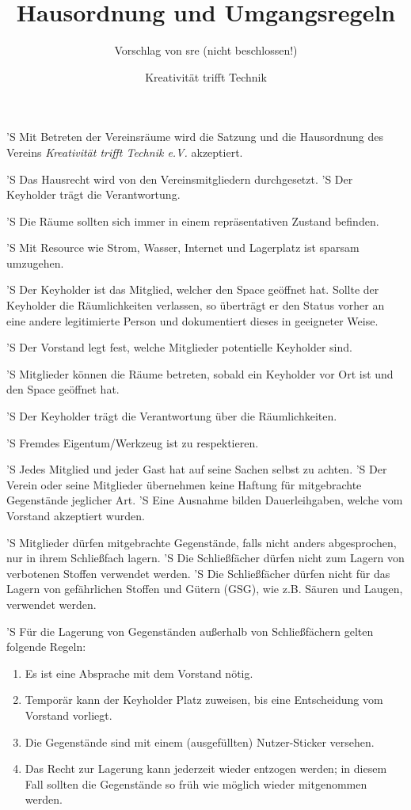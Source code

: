 \documentclass[a4paper,10pt]{scrreprt}
\begin{document}
\title{Hausordnung und Umgangsregeln}
\subtitle{Vorschlag von sre (nicht beschlossen!)}
\author{Kreativität trifft Technik}



\begin{contract}


'S Mit Betreten der Vereinsräume wird die Satzung und die Hausordnung des
Vereins \textit{Kreativität trifft Technik e.V.} akzeptiert.

'S Das Hausrecht wird von den Vereinsmitgliedern durchgesetzt.
'S Der Keyholder trägt die Verantwortung.

'S Die Räume sollten sich immer in einem repräsentativen Zustand befinden.

'S Mit Resource wie Strom, Wasser, Internet und Lagerplatz ist sparsam umzugehen.


'S Der Keyholder ist das Mitglied, welcher den Space geöffnet hat. Sollte der
Keyholder die Räumlichkeiten verlassen, so überträgt er den Status vorher an
eine andere legitimierte Person und dokumentiert dieses in geeigneter Weise.

'S Der Vorstand legt fest, welche Mitglieder potentielle Keyholder sind.

'S Mitglieder können die Räume betreten, sobald ein Keyholder vor Ort ist
und den Space geöffnet hat.

'S Der Keyholder trägt die Verantwortung über die Räumlichkeiten.


'S Fremdes Eigentum/Werkzeug ist zu respektieren.

'S Jedes Mitglied und jeder Gast hat auf seine Sachen selbst zu achten.
'S Der Verein oder seine Mitglieder übernehmen keine Haftung für mitgebrachte
Gegenstände jeglicher Art.
'S Eine Ausnahme bilden Dauerleihgaben, welche vom Vorstand akzeptiert wurden.

'S Mitglieder dürfen mitgebrachte Gegenstände, falls nicht anders abgesprochen,
nur in ihrem Schließfach lagern.
'S Die Schließfächer dürfen nicht zum Lagern von verbotenen Stoffen verwendet
werden.
'S Die Schließfächer dürfen nicht für das Lagern von gefährlichen Stoffen und
Gütern (GSG), wie z.B. Säuren und Laugen, verwendet werden.

'S Für die Lagerung von Gegenständen außerhalb von Schließfächern gelten folgende
Regeln:
\begin{enumerate}
	\item Es ist eine Absprache mit dem Vorstand nötig.
	\item Temporär kann der Keyholder Platz zuweisen, bis eine Entscheidung
	vom Vorstand vorliegt.
	\item Die Gegenstände sind mit einem (ausgefüllten) Nutzer-Sticker versehen.
	\item Das Recht zur Lagerung kann jederzeit wieder entzogen werden; in diesem
	Fall sollten die Gegenstände so früh wie möglich wieder mitgenommen werden.
\end{enumerate}


\end{contract}
\end{document}
